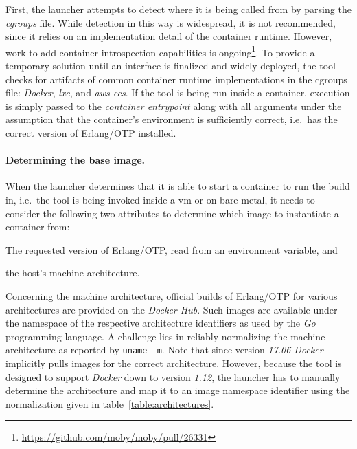 First, the launcher  attempts to detect where it is being called from by parsing the \emph{\acrfull{cgroups}} file. While detection in this way is widespread, it is not recommended, since it relies on an implementation detail of the container runtime. However, work to add container introspection capabilities is ongoing\footnote{\url{https://github.com/moby/moby/pull/26331}}. To provide a temporary solution until an interface is finalized and widely deployed, the tool checks for artifacts of common container runtime implementations in the \acrshort{cgroups} file: \emph{Docker}, \emph{\acrfull{lxc}}, and \emph{\acrfull{aws} \acrfull{ecs}}. If the tool is being run inside a container, execution is simply passed to the \emph{container entrypoint} along with all arguments under the assumption that the container's environment is sufficiently correct, i.e.~has the correct version of Erlang/OTP installed.

\paragraph{Determining the base image.} When the launcher determines that it is able to start a container to run the build in, i.e.~the tool is being invoked inside a \acrshort{vm} or on bare metal, it needs to consider the following two attributes to determine which image to instantiate a container from:
\begin{enumerate*}[label=(\roman*)]
  \item The requested version of Erlang/OTP, read from an environment variable, and
  \item the host's machine architecture.
\end{enumerate*}

Concerning the machine architecture, official builds of Erlang/OTP for various architectures are provided on the \emph{Docker Hub}. Such images are available under the namespace of the respective architecture identifiers as used by the \emph{Go} programming language. A challenge lies in reliably normalizing the machine architecture as reported by \lstinline|uname -m|. Note that since version \emph{17.06 Docker} implicitly pulls images for the correct architecture. However, because the tool is designed to support \emph{Docker} down to version \emph{1.12}, the launcher has to manually determine the architecture and map it to an image namespace identifier using the normalization given in table~\ref{table:architectures}.

